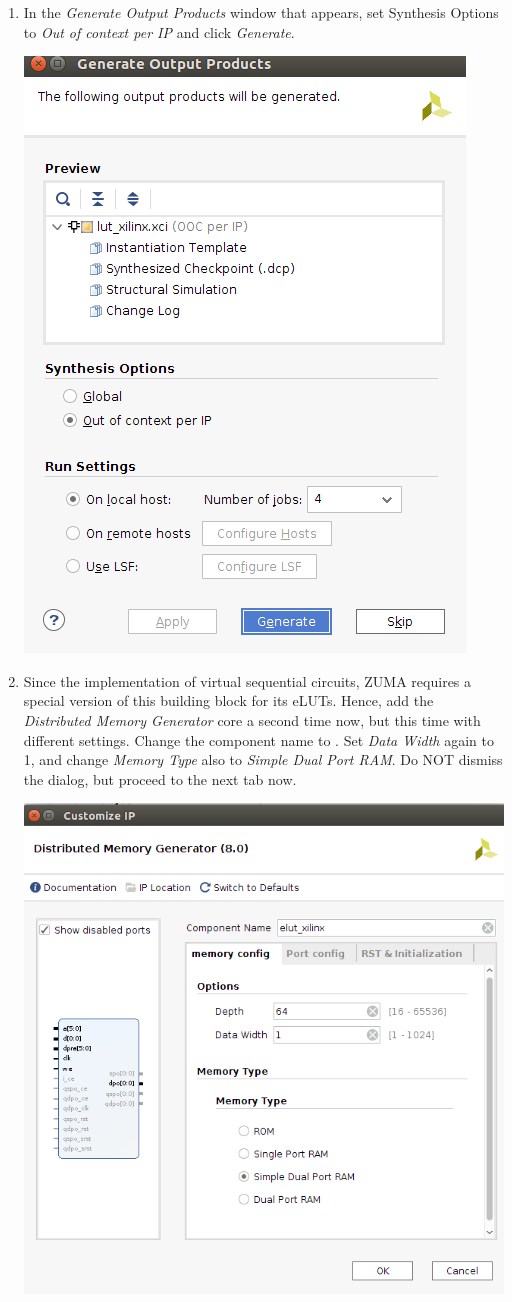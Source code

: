\documentclass{article}
\newcommand{\hwport}[1]{\texttt{\detokenize{#1}}}
\begin{document}
\begin{enumerate}
    \clearpage
    \item In the \emph{Generate Output Products} window that appears, set Synthesis Options to \emph{Out of context per IP} and click \emph{Generate}. %

    \includegraphics[width=0.5\linewidth]{Figures/vivado12.png}
   
    \item Since the implementation of virtual sequential circuits, ZUMA requires a special version of this building block for its eLUTs. Hence, add the \emph{Distributed Memory Generator} core a second time now, but this time with different settings. Change the component name to \hwport{elut_xilinx}. Set \emph{Data Width} again to 1, and change \emph{Memory Type} also to \emph{Simple Dual Port RAM}. Do NOT dismiss the dialog, but proceed to the next tab now.

    \includegraphics[width=0.7\linewidth]{Figures/vivado13.png}


\end{enumerate}
\end{document}
